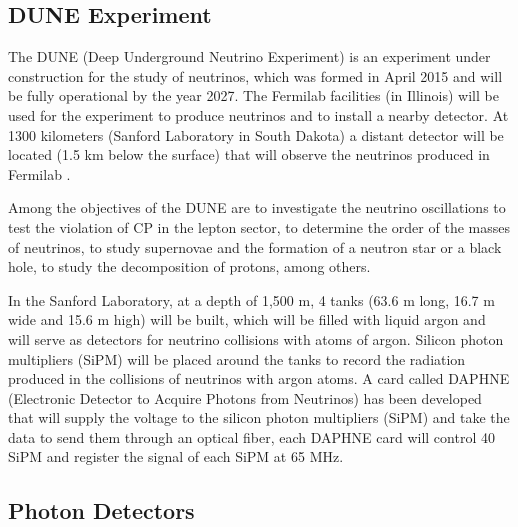 \documentclass[a4paper,10pt,epsfig,epsf,amsfonts,amsmath]{article}
\begin{document}


\subsection{DUNE Experiment}

The DUNE (Deep Underground Neutrino Experiment) is an experiment under construction for the study of neutrinos, which was formed in April 2015 and will be fully operational by the year 2027. The Fermilab facilities (in Illinois) will be used for the experiment to produce neutrinos and to install a nearby detector. At 1300 kilometers (Sanford Laboratory in South Dakota) a distant detector will be located (1.5 km below the surface) that will observe the neutrinos produced in Fermilab \cite{Anderson_2012}.

Among the objectives of the DUNE are to investigate the neutrino oscillations to test the violation of CP in the lepton sector, to determine the order of the masses of neutrinos, to study supernovae and the formation of a neutron star or a black hole, to study the decomposition of protons, among others.

In the Sanford Laboratory, at a depth of 1,500 m, 4 tanks (63.6 m long, 16.7 m wide and 15.6 m high) will be built, which will be filled with liquid argon and will serve as detectors for neutrino collisions with atoms of argon. Silicon photon multipliers (SiPM) will be placed around the tanks to record the radiation produced in the collisions of neutrinos with argon atoms. A card called DAPHNE (Electronic Detector to Acquire Photons from Neutrinos) has been developed that will supply the voltage to the silicon photon multipliers (SiPM) and take the data to send them through an optical fiber, each DAPHNE card will control 40 SiPM and register the signal of each SiPM at 65 MHz.


\subsection{Photon Detectors}
\end{document}
